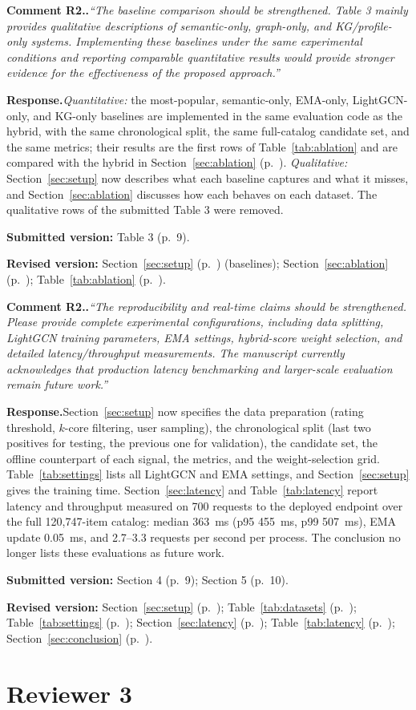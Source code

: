 \documentclass[10pt]{article}
\newcounter{rc}
\newcommand{\reviewer}[1]{\setcounter{rc}{0}\section*{Reviewer #1}}
\newcommand{\point}[2]{\stepcounter{rc}%
  \par\medskip\noindent\textbf{Comment #1.\arabic{rc}.}\enspace\textit{``#2''}\par}
\newcommand{\response}{\noindent\textbf{Response.}\enspace}
\newcommand{\where}[2]{\par\noindent\textbf{Submitted version:} #1\par\noindent\textbf{Revised version:} #2\par}
\newcommand{\sect}[1]{Section~\ref{#1} (p.~\pageref{#1})}
\newcommand{\tabl}[1]{Table~\ref{#1} (p.~\pageref{#1})}
\begin{document}
\point{R2}{The baseline comparison should be strengthened. Table 3 mainly provides qualitative descriptions of semantic-only, graph-only, and KG/profile-only systems. Implementing these baselines under the same experimental conditions and reporting comparable quantitative results would provide stronger evidence for the effectiveness of the proposed approach.}
\response \emph{Quantitative:} the most-popular, semantic-only, EMA-only, LightGCN-only, and KG-only baselines are implemented in the same evaluation code as the hybrid, with the same chronological split, the same full-catalog candidate set, and the same metrics; their results are the first rows of Table~\ref{tab:ablation} and are compared with the hybrid in \sect{sec:ablation}. \emph{Qualitative:} Section~\ref{sec:setup} now describes what each baseline captures and what it misses, and Section~\ref{sec:ablation} discusses how each behaves on each dataset. The qualitative rows of the submitted Table 3 were removed.
\where{Table 3 (p.~9).}{\sect{sec:setup} (baselines); \sect{sec:ablation}; \tabl{tab:ablation}.}

\point{R2}{The reproducibility and real-time claims should be strengthened. Please provide complete experimental configurations, including data splitting, LightGCN training parameters, EMA settings, hybrid-score weight selection, and detailed latency/throughput measurements. The manuscript currently acknowledges that production latency benchmarking and larger-scale evaluation remain future work.}
\response Section~\ref{sec:setup} now specifies the data preparation (rating threshold, $k$-core filtering, user sampling), the chronological split (last two positives for testing, the previous one for validation), the candidate set, the offline counterpart of each signal, the metrics, and the weight-selection grid. Table~\ref{tab:settings} lists all LightGCN and EMA settings, and Section~\ref{sec:setup} gives the training time. Section~\ref{sec:latency} and Table~\ref{tab:latency} report latency and throughput measured on 700 requests to the deployed endpoint over the full 120,747-item catalog: median 363~ms (p95 455~ms, p99 507~ms), EMA update 0.05~ms, and 2.7--3.3 requests per second per process. The conclusion no longer lists these evaluations as future work.
\where{Section 4 (p.~9); Section 5 (p.~10).}{\sect{sec:setup}; \tabl{tab:datasets}; \tabl{tab:settings}; \sect{sec:latency}; \tabl{tab:latency}; \sect{sec:conclusion}.}

\reviewer{3}
\end{document}
